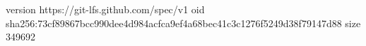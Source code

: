 version https://git-lfs.github.com/spec/v1
oid sha256:73cf89867bcc990dee4d984acfca9ef4a68bec41c3c1276f5249d38f79147d88
size 349692
